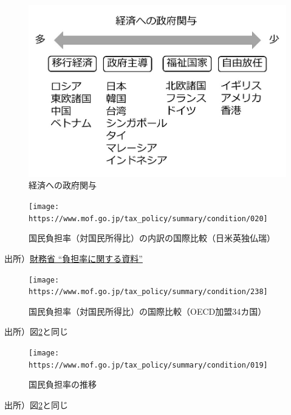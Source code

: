 \documentclass[
]{book}
\begin{document}
\begin{figure}
\includegraphics[width=960px]{poleco} \caption{経済への政府関与}\label{fig:poleco}
\end{figure}

\begin{figure}
\texttt{[image: https://www.mof.go.jp/tax\_policy/summary/condition/020]} \caption{国民負担率（対国民所得比）の内訳の国際比較（日米英独仏瑞）}\label{fig:burden1}
\end{figure}

出所）\href{https://www.mof.go.jp/tax_policy/summary/condition/a04.htm}{財務省 ``負担率に関する資料''}

\begin{figure}
\texttt{[image: https://www.mof.go.jp/tax\_policy/summary/condition/238]} \caption{国民負担率（対国民所得比）の国際比較（OECD加盟34カ国）}\label{fig:burden2}
\end{figure}

出所）図\ref{fig:burden1}と同じ

\begin{figure}
\texttt{[image: https://www.mof.go.jp/tax\_policy/summary/condition/019]} \caption{国民負担率の推移}\label{fig:burden3}
\end{figure}

出所）図\ref{fig:burden1}と同じ
\end{document}
